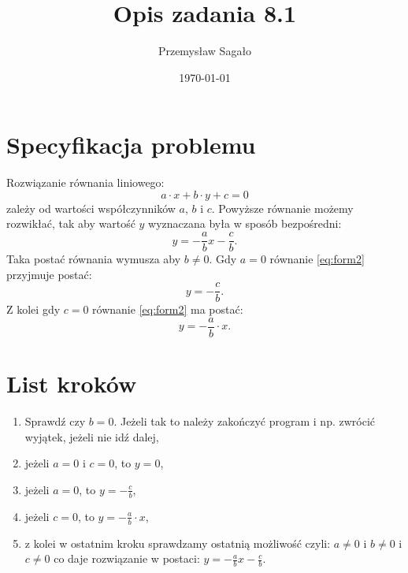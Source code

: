 \documentclass[a4paper]{article}
\title{Opis zadania 8.1}
\author{Przemysław Sagało}
\date{\today}
\begin{document}
\maketitle
\section{Specyfikacja problemu}   
Rozwiązanie równania liniowego:
\begin{equation}
a \cdot x + b \cdot y+c = 0 
\end{equation} 
zależy od wartości współczynników $a$, $b$ i $c$.
Powyższe równanie możemy rozwikłać, tak aby wartość $y$ wyznaczana była w sposób bezpośredni:
\begin{equation}
\label{eq:form2}
y = - \frac{a}{b} x - \frac{c}{b}.
\end{equation}
Taka postać równania wymusza aby $b \neq 0$.
\newline
Gdy $a=0$ równanie \ref{eq:form2} przyjmuje postać:
\begin{equation}
y = - \frac{c}{b}.
\end{equation}
Z kolei gdy $c=0$ równanie \ref{eq:form2} ma postać:
\begin{equation}
y = - \frac{a}{b} \cdot x.
\end{equation}

\section{List kroków}
\begin{enumerate}
\item Sprawdź czy $b=0$. Jeżeli tak to należy zakończyć program i np. zwrócić wyjątek, jeżeli nie idź dalej,
\item jeżeli $a=0$ i $c=0$, to $y=0$,
\item jeżeli $a=0$, to $y = - \frac{c}{b}$,
\item jeżeli $c=0$, to $y = - \frac{a}{b} \cdot x$,
\item z kolei w ostatnim kroku sprawdzamy ostatnią możliwość czyli: $a \neq 0$ i $b \neq 0$ i $c \neq 0$ co daje rozwiązanie w postaci: $y = - \frac{a}{b} x - \frac{c}{b}$.
\end{enumerate}
\end{document}

